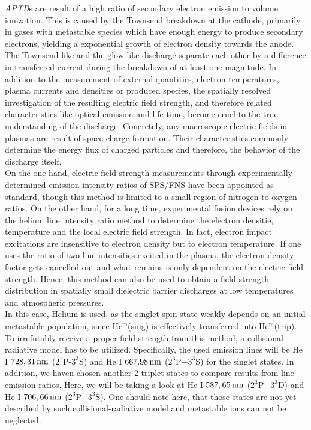 \documentclass[a4paper,10pt,twoside]{article}
\newcommand{\tilt}[1]{\textit{#1}}
\begin{document}
		\tilt{APTD}s are result of a high ratio of secondary electron emission to volume ionization. This is caused by the Townsend breakdown at the cathode, primarily in gases with metastable species which have enough energy to produce secondary electrons, yielding a exponential growth of electron density towards the anode.\\
		The Townsend-like and the glow-like discharge separate each other by a difference in transferred current during the breakdown of at least one magnitude. In addition to the measurement of external quantities, electron temperatures, plasma currents and densities or produced species, the spatially resolved investigation of the resulting electric field strength, and therefore related characteristics like optical emission and life time, become cruel to the true understanding of the discharge. Concretely, any macroscopic electric fields in plasmas are result of space charge formation. Their characteristics commonly determine the energy flux of charged particles and therefore, the behavior of the discharge itself. \\
		On the one hand, electric field strength measurements through experimentally determined emission intensity ratios of SPS/FNS have been appointed as standard, though this method is limited to a small region of nitrogen to oxygen ratios. On the other hand, for a long time, experimental fusion devices rely on the helium line intensity ratio method to determine the electron densitie, temperature and the local electric field strength. In fact, electron impact excitations are insensitive to electron density but to electron temperature. If one uses the ratio of two line intensities excited in the plasma, the electron density factor gets cancelled out and what remains is only dependent on the electric field strength. Hence, this method can also be used to obtain a field strength distribution in spatially small dielectric barrier discharges at low temperatures and atmospheric pressures.\\
		In this case, Helium is used, as the singlet spin state weakly depends on an initial metastable population, since He$^{\text{m}}$(sing) is effectively transferred into He$^{\text{m}}$(trip). To irrefutably receive a proper field strength from this method, a collisional-radiative model has to be utilized. Specifically, the used emission lines will be He I $\unit[728,31]{nm}$ ($2^1$P-$3^3$S) and He I $\unit[667.98]{nm}$ ($2^3$P$-3^3$S) for the singlet states. In addition, we haven chosen another 2 triplet states to compare results from line emission ratios. Here, we will be taking a look at He I $\unit[587,65]{nm}$ ($2^3$P$-3^3$D) and He I $\unit[706,66]{nm}$ ($2^3$P$-3^3$S). One should note here, that those states are not yet described by such collisional-radiative model and metastable ions can not be neglected.\\
\end{document}

